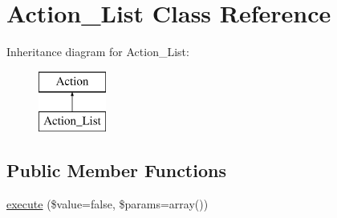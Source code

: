 \hypertarget{class_p_e_a_r2_1_1_console_1_1_command_line_1_1_action___list}{
\section{\-Action\-\_\-\-List \-Class \-Reference}
\label{class_p_e_a_r2_1_1_console_1_1_command_line_1_1_action___list}
}
\-Inheritance diagram for \-Action\-\_\-\-List\-:\begin{figure}[H]
\begin{center}
\leavevmode
\includegraphics[height=2.000000cm]{class_p_e_a_r2_1_1_console_1_1_command_line_1_1_action___list}
\end{center}
\end{figure}
\subsection*{\-Public \-Member \-Functions}
\begin{DoxyCompactItemize}
\item 
\hyperlink{class_p_e_a_r2_1_1_console_1_1_command_line_1_1_action___list_a37f62eb63fef4cc7c2d5f438190b307a}{execute} (\$value=false, \$params=array())
\end{DoxyCompactItemize}


